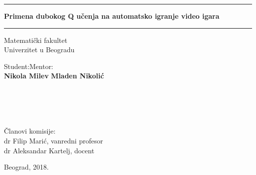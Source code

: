 \documentclass[12pt]{report}
\begin{document}
\begin{titlepage}
    \begin{center}
    
        \vspace*{1cm}
        \hrule
        \vspace*{1cm}
        \textbf{Primena dubokog Q učenja na automatsko igranje video igara}
        \vspace*{1cm}
        \hrule
        \vspace{1cm}
        
		
        \begin{center}
        	Matematički fakultet \\
        	Univerzitet u Beogradu
        \end{center}
        \vspace{1.5cm}
        Student:\hfill Mentor:\\
        \textbf{Nikola Milev}
		\hfill        
        \textbf{Mladen Nikolić} \\
         ~ \\ ~ \\ ~ \\ ~ \\
		\begin{flushleft}
		Članovi komisije:  \\
        dr Filip Marić, vanredni profesor  \\
        dr Aleksandar Kartelj, docent  \\
		\end{flushleft}		        
        
        \vfill
		Beograd, 2018.
    \end{center}
\end{titlepage}

\newpage ~ \thispagestyle{empty}

\tableofcontents{}

\newpage
{}














\end{document}
